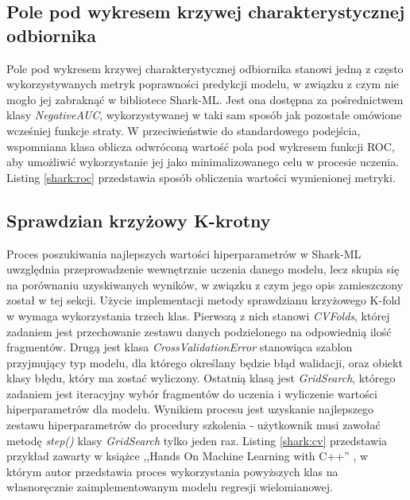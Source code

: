 
\subsection{Pole pod wykresem krzywej charakterystycznej odbiornika}

Pole pod wykresem krzywej charakterystycznej odbiornika stanowi jedną z często wykorzystywanych metryk poprawności predykcji modelu, w związku z czym nie mogło jej zabraknąć w bibliotece Shark-ML. Jest ona dostępna za pośrednictwem klasy \textit{NegativeAUC}, wykorzystywanej w taki sam sposób jak pozostałe omówione wcześniej funkcje straty. W przeciwieństwie do standardowego podejścia, wspomniana klasa oblicza odwróconą wartość pola pod wykresem funkcji ROC, aby umożliwić wykorzystanie jej jako minimalizowanego celu w procesie uczenia. Listing \ref{shark:roc} przedstawia sposób obliczenia wartości wymienionej metryki.


\subsection{Sprawdzian krzyżowy K-krotny}

Proces poszukiwania najlepszych wartości hiperparametrów w Shark-ML uwzględnia przeprowadzenie wewnętrznie uczenia danego modelu, lecz skupia się na porównaniu uzyskiwanych wyników, w związku z czym jego opis zamieszczony został w tej sekcji. Użycie implementacji metody sprawdzianu krzyżowego K-fold w wymaga wykorzystania trzech klas. Pierwszą z nich stanowi \textit{CVFolds}, której zadaniem jest przechowanie zestawu danych podzielonego na odpowiednią ilość fragmentów. Drugą jest klasa \textit{CrossValidationError} stanowiąca szablon przyjmujący typ modelu, dla którego określany będzie błąd walidacji, oraz obiekt klasy błędu, który ma zostać wyliczony. Ostatnią klasą jest \textit{GridSearch}, którego zadaniem jest iteracyjny wybór fragmentów do uczenia i wyliczenie wartości hiperparametrów dla modelu. Wynikiem procesu jest uzyskanie najlepszego zestawu hiperparametrów do procedury szkolenia - użytkownik musi zawołać metodę \textit{step()} klasy \textit{GridSearch} tylko jeden raz. Listing \ref{shark:cv} przedstawia przykład zawarty w książce ,,Hands On Machine Learning with C++'' \cite{handsOnMachineLearning}, w którym autor przedstawia proces wykorzystania powyższych klas na własnoręcznie zaimplementowanym modelu regresji wielomianowej. 

